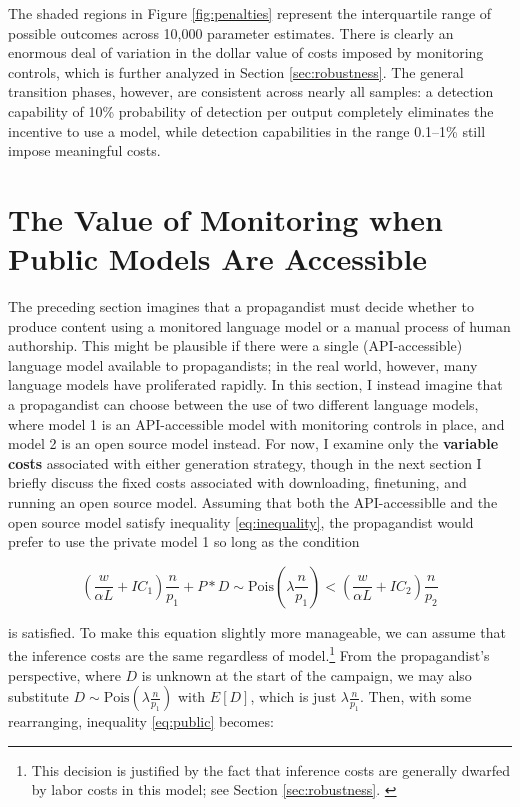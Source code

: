 \documentclass{article}
\begin{document}
The shaded regions in Figure \ref{fig:penalties} represent the interquartile range of possible outcomes across 10,000 parameter estimates. There is clearly an enormous deal of variation in the dollar value of costs imposed by monitoring controls, which is further analyzed in Section \ref{sec:robustness}. The general transition phases, however, are consistent across nearly all samples: a detection capability of 10\% probability of detection per output completely eliminates the incentive to use a model, while detection capabilities in the range 0.1–1\% still impose meaningful costs. 

\section{The Value of Monitoring when Public Models Are Accessible}
\label{sec:comparison}

The preceding section imagines that a propagandist must decide whether to produce content using a monitored language model or a manual process of human authorship. This might be plausible if there were a single (API-accessible) language model available to propagandists; in the real world, however, many language models have proliferated rapidly. \cite{workshop, solaiman} In this section, I instead imagine that a propagandist can choose between the use of two different language models, where model 1 is an API-accessible model with monitoring controls in place, and model 2 is an open source model instead. For now, I examine only the \textbf{variable costs} associated with either generation strategy, though in the next section I briefly discuss the fixed costs associated with downloading, finetuning, and running an open source model. Assuming that both the API-accessiblle and the open source model satisfy inequality \ref{eq:inequality}, the propagandist would prefer to use the private model 1 so long as the condition 

\begin{equation}
  \label{eq:public}
  \left( \frac{w}{\alpha L} + IC_1 \right) \frac{n}{p_1} + P * D \sim \text{Pois}\left( \lambda \frac{n}{p_1} \right) < \left( \frac{w}{\alpha L} + IC_2 \right) \frac{n}{p_2}
\end{equation}

is satisfied. To make this equation slightly more manageable, we can assume that the inference costs are the same regardless of model.\footnote{This decision is justified by the fact that inference costs are generally dwarfed by labor costs in this model; see Section \ref{sec:robustness}. \label{icequivalent}} From the propagandist's perspective, where $D$ is unknown at the start of the campaign, we may also substitute $D \sim \text{Pois}\left( \lambda \frac{n}{p_1} \right)$ with $E[D]$, which is just $\lambda \frac{n}{p_1}$. Then, with some rearranging, inequality \ref{eq:public} becomes:
\end{document}
